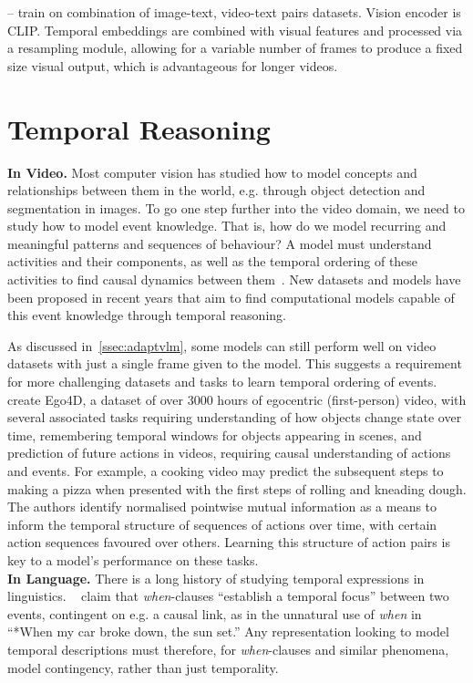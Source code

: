 \citet{alayrac2022flamingo} -- train on combination of image-text, video-text pairs datasets. Vision encoder is CLIP. Temporal embeddings are combined with visual features and processed via a resampling module, allowing for a variable number of frames to produce a fixed size visual output, which is advantageous for longer videos.

\section{Temporal Reasoning}
\label{sec:tempreason}


\noindent\textbf{In Video.}\hspace{0.2cm}
Most computer vision has studied how to model concepts and relationships
between them in the world, e.g. through object detection and segmentation in
images. To go one step further into the video domain, we need to study how to
model event knowledge. That is, how do we model recurring and meaningful
patterns and sequences of behaviour? A model must understand activities and
their components, as well as the temporal ordering of these activities to find
causal dynamics between them~\citep{elman2019event}. New datasets and models
have been proposed in recent years that aim to find computational models
capable of this event knowledge through temporal reasoning. 

As discussed in~\cref{ssec:adaptvlm}, some models can still perform well on
video datasets with just a single frame given to the model. This suggests a
requirement for more challenging datasets and tasks to learn temporal ordering
of events. \citet{grauman2022ego4d} create Ego4D, a dataset of over 3000 hours
of egocentric (first-person) video, with several associated tasks requiring
understanding of how objects change state over time, remembering temporal
windows for objects appearing in scenes, and prediction of future actions in
videos, requiring causal understanding of actions and events. For example, a
cooking video may predict the subsequent steps to making a pizza when presented
with the first steps of rolling and kneading dough. The authors identify
normalised pointwise mutual information as a means to inform the temporal
structure of sequences of actions over time, with certain action sequences
favoured over others. Learning this structure of action pairs is key to a
model's performance on these tasks.\\

\noindent\textbf{In Language.}\hspace{0.2cm}
There is a long history of studying temporal expressions in linguistics.
~\citet{moens1988temporal} claim that \textit{when}-clauses ``establish a
temporal focus'' between two events, contingent on e.g. a causal link, as in
the unnatural use of \textit{when} in ``*When my car broke down, the sun set.''
Any representation looking to model temporal descriptions must therefore, for
\textit{when}-clauses and similar phenomena, model contingency, rather than
just temporality.

